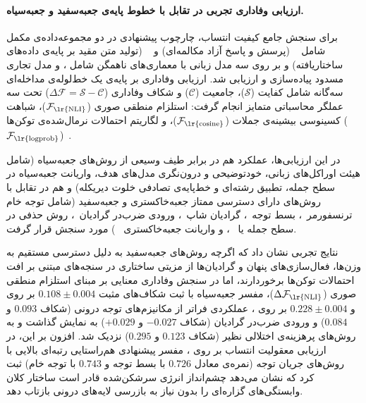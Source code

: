 \paragraph{ارزیابی وفاداری تجربی در تقابل با خطوط پایه‌ی جعبه‌سفید و جعبه‌سیاه.}
برای سنجش جامع کیفیت انتساب، چارچوب پیشنهادی در دو مجموعه‌داده‌ی مکمل شامل ~\cite{guo2023closechatgpthumanexperts} (پرسش و پاسخ آزاد مکالمه‌ای) و ~\cite{lebret2016neural} (تولید متن مقید بر پایه‌ی داده‌های ساختاریافته) و بر روی سه مدل زبانی با معماری‌های ناهمگن شامل ،  و مدل تجاری مسدود  پیاده‌سازی و ارزیابی شد. ارزیابی وفاداری بر پایه‌ی یک خط‌لوله‌ی مداخله‌ای سه‌گانه شامل کفایت ($\mathcal{S}$)، جامعیت ($\mathcal{C}$) و شکاف وفاداری ($\Delta\mathcal{F} = \mathcal{S} - \mathcal{C}$) تحت سه عملگر محاسباتی متمایز انجام گرفت: استلزام منطقی صوری ($\mathcal{F}_{\text{\lr{NLI}}}$)، شباهت کسینوسی بیشینه‌ی جملات ($\mathcal{F}_{\text{\lr{cosine}}}$)، و لگاریتم احتمالات نرمال‌شده‌ی توکن‌ها ($\mathcal{F}_{\text{\lr{logprob}}}$)~\cite{carton2020evaluating, atanasova2023faithfulness}.

در این ارزیابی‌ها، عملکرد  هم در برابر طیف وسیعی از روش‌های جعبه‌سیاه (شامل هیئت اوراکل‌های زبانی، خودتوضیحی و درون‌نگری مدل‌های هدف، واریانت جعبه‌سیاه  در سطح جمله، تطبیق رشته‌ای و خط‌پایه‌ی تصادفی خلوت دیریکله) و هم در تقابل با روش‌های دارای دسترسی ممتاز جعبه‌خاکستری و جعبه‌سفید (شامل توجه خام ترنسفورمر~\cite{vaswani2017attention}، بسط توجه~\cite{abnar2020quantifying}، گرادیان شاپ~\cite{lundberg2017unified}، ورودی ضرب‌در گرادیان~\cite{li2016visualizing, simonyan2014deepinside}، روش حذفی در سطح جمله یا ~\cite{li2017understanding, zeiler2014visualizing}، و واریانت جعبه‌خاکستری ~\cite{ribeiro2016lime}) مورد سنجش قرار گرفت. 

نتایج تجربی نشان داد که اگرچه روش‌های جعبه‌سفید به دلیل دسترسی مستقیم به وزن‌ها، فعال‌سازی‌های پنهان و گرادیان‌ها از مزیتی ساختاری در سنجه‌های مبتنی بر افت احتمالات توکن‌ها برخوردارند، اما در سنجش وفاداری معنایی بر مبنای استلزام منطقی صوری ($\Delta\mathcal{F}_{\text{\lr{NLI}}}$)، مفسر جعبه‌سیاه  با ثبت شکاف‌های مثبت $0.108 \pm 0.004$ بر روی  و $0.228 \pm 0.004$ بر روی ، عملکردی فراتر از مکانیزم‌های توجه درونی (شکاف $0.093$ و $0.084$) و ورودی ضرب‌در گرادیان (شکاف $-0.027$ و $+0.029$) به نمایش گذاشت و به روش‌های پرهزینه‌ی اختلالی نظیر  (شکاف $0.123$ و $0.295$) نزدیک شد. افزون بر این، در ارزیابی معقولیت انتساب بر روی ، مفسر پیشنهادی هم‌راستایی رتبه‌ای بالایی با روش‌های جریان توجه (نمره‌ی  معادل $0.726$ با بسط توجه و $0.743$ با توجه خام) ثبت کرد که نشان می‌دهد چشم‌انداز انرژی سرشکن‌شده قادر است ساختار کلان وابستگی‌های گزاره‌ای را بدون نیاز به بازرسی لایه‌های درونی بازتاب دهد.

